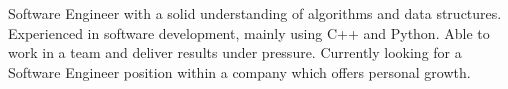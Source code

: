 
\begin{cvparagraph}
Software Engineer with a solid understanding of algorithms and data structures. Experienced in software development, mainly using C++ and Python. Able to work in a team and deliver results under pressure. Currently looking for a Software Engineer position within a company which offers personal growth.
\end{cvparagraph}
